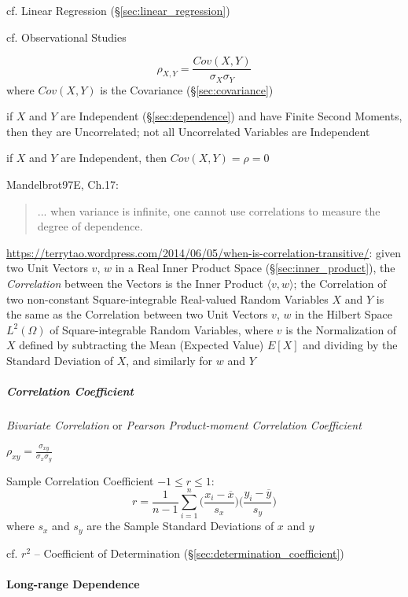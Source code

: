 \fist cf. Linear Regression (\S\ref{sec:linear_regression})

cf. Observational Studies

\[
  \rho_{X,Y} = \frac{Cov(X,Y)}{\sigma_X \sigma_Y}
\]
where $Cov(X,Y)$ is the Covariance (\S\ref{sec:covariance})

if $X$ and $Y$ are Independent (\S\ref{sec:dependence}) and have Finite Second
Moments, then they are Uncorrelated; not all Uncorrelated Variables are
Independent

if $X$ and $Y$ are Independent, then $Cov(X,Y) = \rho = 0$

Mandelbrot97E, Ch.17:
\begin{quote}
  ... when variance is infinite, one cannot use correlations to measure the
  degree of dependence.
\end{quote}

\url{https://terrytao.wordpress.com/2014/06/05/when-is-correlation-transitive/}:
given two Unit Vectors $v$, $w$ in a Real Inner Product Space
(\S\ref{sec:inner_product}), the \emph{Correlation} between the Vectors is the
Inner Product $\langle{v,w}\rangle$; the Correlation of two non-constant
Square-integrable Real-valued Random Variables $X$ and $Y$ is the same as the
Correlation between two Unit Vectors $v$, $w$ in the Hilbert Space $L^2(\Omega)$
of Square-integrable Random Variables, where $v$ is the Normalization of $X$
defined by subtracting the Mean (Expected Value) $E[X]$ and dividing by the
Standard Deviation of $X$, and similarly for $w$ and $Y$



\subparagraph{Correlation Coefficient}\label{sec:correlation_coefficient}\hfill

\emph{Bivariate Correlation} or \emph{Pearson Product-moment Correlation
  Coefficient}

$\rho_{xy} = \frac{\sigma_{xy}}{\sigma_x \sigma_y}$

Sample Correlation Coefficient $-1 \leq r \leq 1$:
\[
  r = \frac{1}{n-1} \sum_{i=1}^n
    \Big(\frac{x_i - \overline{x}}{s_x}\Big)
    \Big(\frac{y_i - \overline{y}}{s_y}\Big)
\]
where $s_x$ and $s_y$ are the Sample Standard Deviations of $x$ and $y$

\fist cf. $r^2$ -- Coefficient of
Determination (\S\ref{sec:determination_coefficient})



\paragraph{Long-range Dependence}\label{sec:long_range_dependence}\hfill

